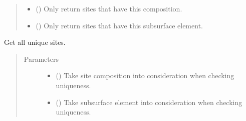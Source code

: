\documentclass[letterpaper,10pt,english]{sphinxmanual}
\begin{document}
\begin{fulllineitems}
\begin{fulllineitems}
\begin{quote}
\begin{description}
\begin{itemize}
\item {} 
 (\sphinxstyleliteralemphasis{\sphinxupquote{, }}) \textendash{} Only return sites that have this composition.

\item {} 
 (\sphinxstyleliteralemphasis{\sphinxupquote{, }}) \textendash{} Only return sites that have this subsurface element.

\end{itemize}

\end{description}\end{quote}

\end{fulllineitems}


\begin{fulllineitems}
\label{\detokenize{modules:acat.adsorption_sites.ClusterAdsorptionSites.get_unique_sites}}
Get all unique sites.
\begin{quote}\begin{description}
\item[{Parameters}] \leavevmode\begin{itemize}
\item {} 
 (\sphinxstyleliteralemphasis{\sphinxupquote{, }}) \textendash{} Take site composition into consideration when
checking uniqueness.

\item {} 
 (\sphinxstyleliteralemphasis{\sphinxupquote{, }}) \textendash{} Take subsurface element into consideration when
checking uniqueness.


\end{itemize}
\end{description}
\end{quote}
\end{fulllineitems}
\end{fulllineitems}
\end{document}
